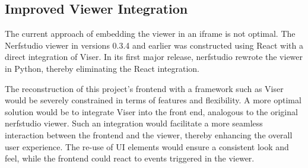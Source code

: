 \subsection*{Improved Viewer Integration}

The current approach of embedding the viewer in an iframe is not optimal.
The Nerfstudio viewer in versions 0.3.4 and earlier was constructed using React with a direct integration of Viser.
In its first major release, nerfstudio rewrote the viewer in Python, thereby eliminating the React integration.

The reconstruction of this project's frontend with a framework such as Viser would be severely constrained in terms of features and flexibility.
A more optimal solution would be to integrate Viser into the front end, analogous to the original nerfstudio viewer.
Such an integration would facilitate a more seamless interaction between the frontend and the viewer, thereby enhancing the overall user experience.
The re-use of UI elements would ensure a consistent look and feel, while the frontend could react to events triggered in the viewer.